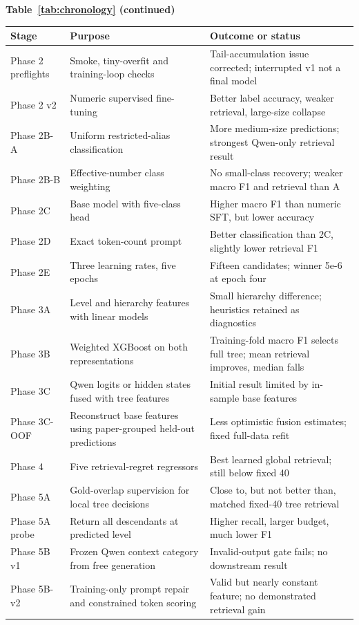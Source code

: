 \newpage
\begin{center}
\small
\textbf{Table~\ref{tab:chronology} (continued)}\par\medskip
\begin{tabular}{@{}>{\raggedright\arraybackslash}p{2cm}>{\raggedright\arraybackslash}p{5.3cm}>{\raggedright\arraybackslash}p{5.8cm}@{}}
\toprule
Stage & Purpose & Outcome or status\\
\midrule
Phase 2 preflights & Smoke, tiny-overfit and training-loop checks & Tail-accumulation issue corrected; interrupted v1 not a final model\\
Phase 2 v2 & Numeric supervised fine-tuning & Better label accuracy, weaker retrieval, large-size collapse\\
Phase 2B-A & Uniform restricted-alias classification & More medium-size predictions; strongest Qwen-only retrieval result\\
Phase 2B-B & Effective-number class weighting & No small-class recovery; weaker macro F1 and retrieval than A\\
Phase 2C & Base model with five-class head & Higher macro F1 than numeric SFT, but lower accuracy\\
Phase 2D & Exact token-count prompt & Better classification than 2C, slightly lower retrieval F1\\
Phase 2E & Three learning rates, five epochs & Fifteen candidates; winner 5e-6 at epoch four\\
Phase 3A & Level and hierarchy features with linear models & Small hierarchy difference; heuristics retained as diagnostics\\
Phase 3B & Weighted XGBoost on both representations & Training-fold macro F1 selects full tree; mean retrieval improves, median falls\\
Phase 3C & Qwen logits or hidden states fused with tree features & Initial result limited by in-sample base features\\
Phase 3C-OOF & Reconstruct base features using paper-grouped held-out predictions & Less optimistic fusion estimates; fixed full-data refit\\
Phase 4 & Five retrieval-regret regressors & Best learned global retrieval; still below fixed 40\\
Phase 5A & Gold-overlap supervision for local tree decisions & Close to, but not better than, matched fixed-40 tree retrieval\\
Phase 5A probe & Return all descendants at predicted level & Higher recall, larger budget, much lower F1\\
Phase 5B v1 & Frozen Qwen context category from free generation & Invalid-output gate fails; no downstream result\\
Phase 5B-v2 & Training-only prompt repair and constrained token scoring & Valid but nearly constant feature; no demonstrated retrieval gain\\
\bottomrule
\end{tabular}
\end{center}

